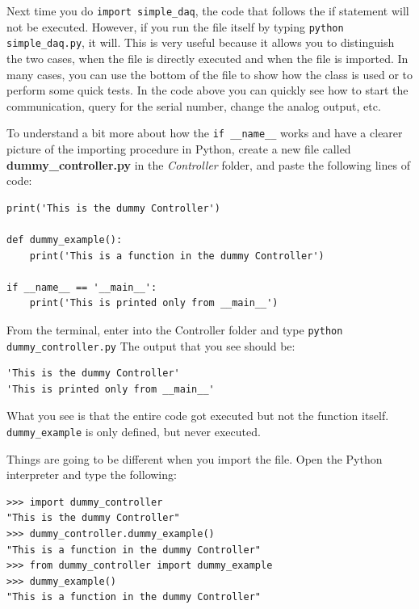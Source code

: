 Next time you do \texttt{import simple_daq}, the code that follows the if statement will not be executed. However, if you run the file  itself by typing \texttt{python simple_daq.py}, it will. This is very useful because it allows you to distinguish the two cases, when the file is directly executed and when the file is imported. In many cases, you can use the bottom of the file to show how the class is used or to perform some quick tests. In the code above you can quickly see how to start the communication, query for the serial number, change the analog output, etc.

To understand a bit more about how the \texttt{if __name__} works and have a clearer picture of the importing procedure in Python, create
a new file called \textbf{dummy\_controller.py} in the \emph{Controller} folder, and paste the following lines of code:

\begin{verbatim}
print('This is the dummy Controller')

def dummy_example():
    print('This is a function in the dummy Controller')

if __name__ == '__main__':
    print('This is printed only from __main__')
\end{verbatim}

From the terminal, enter into the Controller folder and type \texttt{python dummy_controller.py} The output that you see should be:

\begin{verbatim}
'This is the dummy Controller'
'This is printed only from __main__'
\end{verbatim}

What you see is that the entire code got executed but not the function itself. \texttt{dummy_example} is only defined, but never executed.


Things are going to be different when you import the file. Open the Python interpreter and type the following:

\begin{verbatim}
>>> import dummy_controller
"This is the dummy Controller"
>>> dummy_controller.dummy_example()
"This is a function in the dummy Controller"
>>> from dummy_controller import dummy_example
>>> dummy_example()
"This is a function in the dummy Controller"
\end{verbatim}

